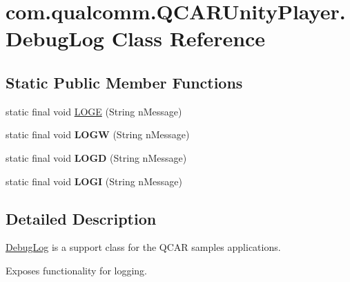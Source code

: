 \hypertarget{classcom_1_1qualcomm_1_1_q_c_a_r_unity_player_1_1_debug_log}{}\section{com.\+qualcomm.\+Q\+C\+A\+R\+Unity\+Player.\+Debug\+Log Class Reference}
\label{classcom_1_1qualcomm_1_1_q_c_a_r_unity_player_1_1_debug_log}
\subsection*{Static Public Member Functions}
\begin{DoxyCompactItemize}
\item 
static final void \hyperlink{classcom_1_1qualcomm_1_1_q_c_a_r_unity_player_1_1_debug_log_a5f14b831b9f9c59faefb8aa7a0c635cc_a5f14b831b9f9c59faefb8aa7a0c635cc}{L\+O\+G\+E} (String n\+Message)
\item 
\hypertarget{classcom_1_1qualcomm_1_1_q_c_a_r_unity_player_1_1_debug_log_a7dacdea9794e3fb83ff1df49e9fe0ab4}{}static final void {\bfseries L\+O\+G\+W} (String n\+Message)\label{classcom_1_1qualcomm_1_1_q_c_a_r_unity_player_1_1_debug_log_a7dacdea9794e3fb83ff1df49e9fe0ab4}

\item 
\hypertarget{classcom_1_1qualcomm_1_1_q_c_a_r_unity_player_1_1_debug_log_a2b0d1dc84bf358b5e3443731f7d1c118}{}static final void {\bfseries L\+O\+G\+D} (String n\+Message)\label{classcom_1_1qualcomm_1_1_q_c_a_r_unity_player_1_1_debug_log_a2b0d1dc84bf358b5e3443731f7d1c118}

\item 
\hypertarget{classcom_1_1qualcomm_1_1_q_c_a_r_unity_player_1_1_debug_log_a8f98c74130d787575358ba8a5afbde3e}{}static final void {\bfseries L\+O\+G\+I} (String n\+Message)\label{classcom_1_1qualcomm_1_1_q_c_a_r_unity_player_1_1_debug_log_a8f98c74130d787575358ba8a5afbde3e}

\end{DoxyCompactItemize}


\subsection{Detailed Description}
\hyperlink{classcom_1_1qualcomm_1_1_q_c_a_r_unity_player_1_1_debug_log}{Debug\+Log} is a support class for the Q\+C\+A\+R samples applications.

Exposes functionality for logging. 

